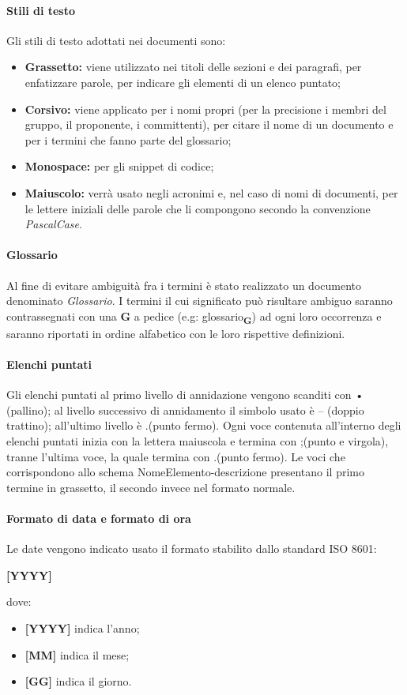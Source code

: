 \paragraph{Stili di testo}
Gli stili di testo adottati nei documenti sono: 
\begin{itemize}
	\item \textbf{Grassetto:} viene utilizzato nei titoli delle sezioni e dei paragrafi, per enfatizzare parole, per indicare gli elementi di un elenco puntato;
	\item \textbf{Corsivo:} viene applicato per i nomi propri (per la precisione i membri del gruppo, il proponente, i committenti), per citare il nome di un documento e per i termini che fanno parte del glossario;
	\item \textbf{Monospace:} per gli snippet di codice;
	\item \textbf{Maiuscolo:} verrà usato negli acronimi e, nel caso di nomi di documenti, per le lettere iniziali delle parole che li compongono secondo la convenzione \textit{PascalCase}.
\end{itemize}
\paragraph{Glossario}  
Al fine di evitare ambiguità fra i termini è stato realizzato un documento denominato \textit{Glossario}. I termini il cui significato può risultare ambiguo saranno contrassegnati con una \textbf{G} a pedice (e.g: \texorpdfstring{glossario\textsubscript{\textbf{G}}})) ad ogni loro occorrenza e saranno riportati in ordine alfabetico con le loro rispettive definizioni.
\paragraph{Elenchi puntati}
Gli elenchi puntati al primo livello di annidazione vengono scanditi con • (pallino); al livello successivo di annidamento il simbolo usato è -- (doppio trattino); all'ultimo livello è .(punto fermo).\newline
Ogni voce contenuta all'interno degli elenchi puntati inizia con la lettera maiuscola e termina con ;(punto e virgola), tranne l'ultima voce, la quale termina con .(punto fermo).\newline
Le voci che corrispondono allo schema NomeElemento-descrizione presentano il primo termine in grassetto, il secondo invece nel formato normale. 
\paragraph{Formato di data e formato di ora}
Le date vengono indicato usato il formato stabilito dallo standard ISO 8601:\newline
\centerline{\textbf{[YYYY]\-[MM]\-[DD]}}
\newline
dove:
\begin{itemize}
	\item \textbf{[YYYY]} indica l'anno;
	\item \textbf{[MM]} indica il mese;
	\item \textbf{[GG]} indica il giorno.
\end{itemize}
